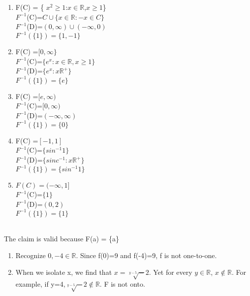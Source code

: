 \documentclass[12pt]{article}
\newenvironment{problem}[2][Problem]{\begin{trivlist}
\item[\hskip \labelsep {\bfseries #1}\hskip \labelsep {\bfseries #2.}]}{\end{trivlist}}
\begin{document}
\begin{enumerate}
\item F(C) = \{ $x^2 \geq 1$:$x \in \mathbb{R}$,$x\geq 1$\}
\\
$F^{-1}$(C)=$C \cup \{x \in \mathbb{R} : -x \in C\}$
\\
$F^{-1}$(D)=$( 0, \infty ) \cup (-\infty , 0)$
\\
$F^{-1}(\{1\})= \{ 1, -1\} $
\\
\item F(C) =$[ 0, \infty\}$
\\
$F^{-1}$(C)=$\{ e^x : x \in \mathbb{R}, x \geq 1\}$
\\
$F^{-1}$(D)=$\{e^x: x \mathbb{R}^+ \}$
\\
$F^{-1}(\{1\})= \{ e \} $
\\
\item F(C) =$[ e, \infty )$
\\
$F^{-1}$(C)=$[0,\infty)$
\\
$F^{-1}$(D)=$(- \infty, \infty)$
\\
$F^{-1}(\{1\})= \{ 0 \} $
\\
\item
F(C) =$[ -1, 1 ]$
\\
$F^{-1}$(C)=$\{ sin ^{-1} 1\}$
\\
$F^{-1}$(D)=$\{ sinc^{-1}: x \mathbb{R}^+ \}$
\\
$F^{-1}(\{1\})= \{ sin ^{-1} 1\}$
\\
\item
$F(C) =( - \infty, 1 ]$
\\
$F^{-1}$(C)=$\{1\}$
\\
$F^{-1}$(D)=$(0,2)$
\\
$F^{-1}(\{1\})=\{ 1 \}$
\end{enumerate}

\begin{problem}{9.23}
\text{ }\\
The claim is valid because F(a) = \{a\}
\end{problem}


\begin{problem}{9.24}
\text{ }
\end{problem}
\begin{enumerate}
\item Recognize $0,-4\in\mathbb{R}$. Since f(0)=9 and f(-4)=9, f is not one-to-one.
\item When we isolate x, we find that $x=\sqrt[y-5]-2$. Yet for every $y\in \mathbb{R}$, $x \not \in \mathbb{R}$. For example, if y=4,$\sqrt[y-5]-2 \not \in \mathbb{R}$. F is not onto.
\end{enumerate}
\end{document}
